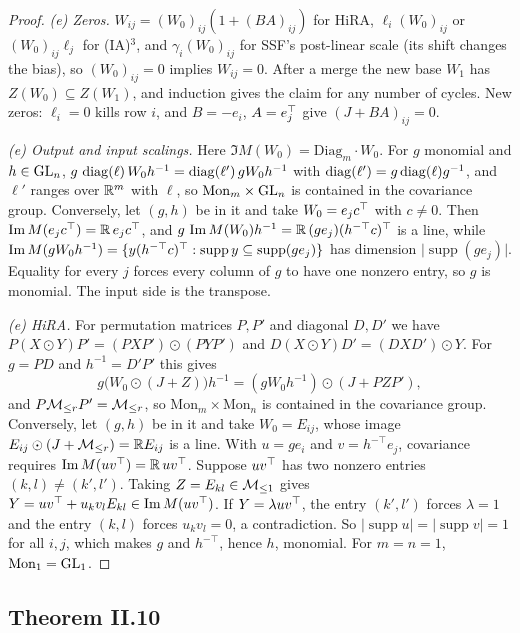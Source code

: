\begin{proof}
\emph{(e) Zeros.} $W_{ij}=(W_0)_{ij}(1+(BA)_{ij})$ for HiRA, $\ell_i(W_0)_{ij}$ or $(W_0)_{ij}\ell_j$ for (IA)$^3$, and
$\gamma_i(W_0)_{ij}$ for SSF's post-linear scale (its shift changes the bias), so $(W_0)_{ij}=0$ implies $W_{ij}=0$. After a
merge the new base $W_1$ has $Z(W_0)\subseteq Z(W_1)$, and induction gives the claim for any number of cycles. New zeros:
$\ell_i=0$ kills row $i$, and $B=-e_i$, $A=e_j^{\top}$ give $(J+BA)_{ij}=0$.

\emph{(e) Output and input scalings.} Here $\Im M(W_0)=\mathrm{Diag}_m\cdot W_0$. For $g$ monomial and $h\in\mathrm{GL}_n$,
$g\,\operatorname{diag}(\ell)\,W_0h^{-1}=\operatorname{diag}(\ell')\,gW_0h^{-1}$ with $\operatorname{diag}(\ell')=g\operatorname{diag}(\ell)g^{-1}$, and $\ell'$ ranges over $\mathbb{R}^m$
with $\ell$, so $\mathrm{Mon}_m\times\mathrm{GL}_n$ is contained in the covariance group. Conversely, let $(g,h)$ be in it and take
$W_0=e_jc^{\top}$ with $c\ne0$. Then $\operatorname{Im} M(e_jc^{\top})=\mathbb{R}\,e_jc^{\top}$, and $g\,\operatorname{Im} M(W_0)h^{-1}=\mathbb{R}\,(ge_j)(h^{-\top}c)^{\top}$ is a line,
while $\operatorname{Im} M(gW_0h^{-1})=\{y(h^{-\top}c)^{\top}:\operatorname{supp}y\subseteq\operatorname{supp}(ge_j)\}$ has dimension
$\lvert\operatorname{supp}(ge_j)\rvert$. Equality for every $j$ forces every column of $g$ to have one nonzero entry, so $g$ is
monomial. The input side is the transpose.

\emph{(e) HiRA.} For permutation matrices $P,P'$ and diagonal $D,D'$ we have $P(X\odot Y)P'=(PXP')\odot(PYP')$ and
$D(X\odot Y)D'=(DXD')\odot Y$. For $g=PD$ and $h^{-1}=D'P'$ this gives
\begin{equation*}
  g\big(W_0\odot(J+Z)\big)h^{-1}=(gW_0h^{-1})\odot(J+PZP'),
\end{equation*}
and $P\mathcal{M}_{\le r} P'=\mathcal{M}_{\le r}$, so $\mathrm{Mon}_m\times\mathrm{Mon}_n$ is contained in the covariance group. Conversely, let $(g,h)$ be in
it and take $W_0=E_{ij}$, whose image $E_{ij}\odot(J+\mathcal{M}_{\le r})=\mathbb{R} E_{ij}$ is a line. With $u=ge_i$ and $v=h^{-\top}e_j$,
covariance requires $\operatorname{Im} M(uv^{\top})=\mathbb{R}\,uv^{\top}$. Suppose $uv^{\top}$ has two nonzero entries $(k,l)\ne(k',l')$. Taking $Z=E_{kl}\in\mathcal{M}_{\le1}$
gives $Y=uv^{\top}+u_kv_lE_{kl}\in\operatorname{Im} M(uv^{\top})$. If $Y=\lambda uv^{\top}$, the entry $(k',l')$ forces $\lambda=1$ and the entry $(k,l)$
forces $u_kv_l=0$, a contradiction. So $\lvert\operatorname{supp}u\rvert=\lvert\operatorname{supp}v\rvert=1$ for all $i,j$,
which makes $g$ and $h^{-\top}$, hence $h$, monomial. For $m=n=1$, $\mathrm{Mon}_1=\mathrm{GL}_1$.
\end{proof}

\subsection{Theorem II.10}\label{proof:II.10}

